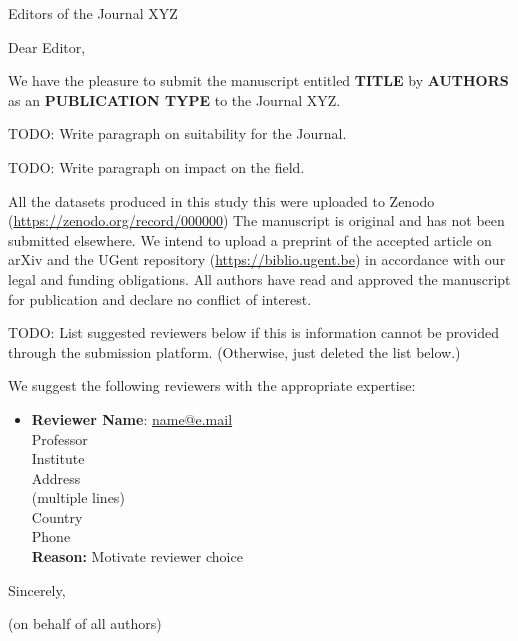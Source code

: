 \documentclass[faculty=we,rightcolwidth=.38]{ugent-letter}
\begin{document}
\mydate{\today}
\mysubject{}

\begin{letter}{
Editors of the Journal XYZ
}

\opening{Dear Editor,}

We have the pleasure to submit the manuscript entitled
\textbf{TITLE}
by \textbf{AUTHORS} as an \textbf{PUBLICATION TYPE} to the Journal XYZ.

TODO: Write paragraph on suitability for the Journal.

TODO: Write paragraph on impact on the field.

All the datasets produced in this study this were uploaded to Zenodo (\url{https://zenodo.org/record/000000}) The manuscript is original and has not been submitted elsewhere.
We intend to upload a preprint of the accepted article on arXiv and the UGent repository (\url{https://biblio.ugent.be}) in accordance with our legal and funding obligations.
All authors have read and approved the manuscript for publication and declare no conflict of interest.

TODO: List suggested reviewers below if this is information cannot be provided through the submission platform. (Otherwise, just deleted the list below.)

We suggest the following reviewers with the appropriate expertise:
%
\begin{itemize}[itemsep=12pt]
    \item
    \begin{minipage}[t]{\linewidth}
    \textbf{Reviewer Name}: \href{mailto:name@e.mail}{name@e.mail} \\
    Professor \\
    Institute \\
    Address \\
    (multiple lines) \\
    Country \\
    Phone \\
    \textbf{Reason:} Motivate reviewer choice
    \end{minipage}
\end{itemize}

\closing{Sincerely,}
(on behalf of all authors)

\end{letter}
\end{document}
